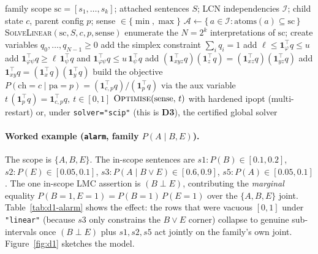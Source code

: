 \documentclass[11pt]{article}
\begin{document}
\begin{algorithm}[t]
\caption{D1 local credal set for one family (\texttt{\_build\_linear\_tight\_model})}
\label{alg:d1}
\begin{algorithmic}[1]
\Require family scope $\mathrm{sc}=[s_1,\dots,s_k]$; attached sentences $S$; LCN
  independencies $\mathcal I$; child state $c$, parent config $p$; sense $\in\{\min,\max\}$
\State $\mathcal A \gets \{\,a\in\mathcal I : \mathrm{atoms}(a)\subseteq \mathrm{sc}\,\}$
 \Return \textsc{SolveLinear}$(\mathrm{sc},S,c,p,\text{sense})$
\EndIf
\State enumerate the $N=2^{k}$ interpretations of $\mathrm{sc}$; create variables
  $q_0,\dots,q_{N-1}\ge 0$ 
\State add the simplex constraint $\sum_i q_i = 1$
     add $\ell \le \mathbf 1_\varphi^\top q \le u$
     add $\mathbf 1_{\varphi\psi}^\top q \ge \ell\,\mathbf 1_\psi^\top q$ and
     $\mathbf 1_{\varphi\psi}^\top q \le u\,\mathbf 1_\psi^\top q$
  \EndIf
\EndFor
{}
     add $(\mathbf 1_{xyz}^\top q)(\mathbf 1_z^\top q) = (\mathbf 1_{xz}^\top q)(\mathbf 1_{yz}^\top q)$
     add $\mathbf 1_{xy}^\top q = (\mathbf 1_x^\top q)(\mathbf 1_y^\top q)$
  \EndIf
\EndFor
\State build the objective $P(\mathrm{ch}{=}c\mid\mathrm{pa}{=}p)
  = (\mathbf 1_{c,p}^\top q)/(\mathbf 1_{p}^\top q)$ via the aux variable
  $t\,(\mathbf 1_p^\top q) = \mathbf 1_{c,p}^\top q,\ t\in[0,1]$
\State \Return $\textsc{Optimise}(\text{sense},\,t)$ with hardened ipopt
  (multi-restart) or, under \texttt{solver="scip"} (this is \textbf{D3}), the certified global
  solver
\end{algorithmic}
\end{algorithm}

\paragraph{Worked example (\texttt{alarm}, family $P(A\mid B,E)$).} The scope is $\{A,B,E\}$.
The in-scope sentences are $s1\!:\!P(B)\!\in\![0.1,0.2]$, $s2\!:\!P(E)\!\in\![0.05,0.1]$,
$s3\!:\!P(A\mid B{\lor}E)\!\in\![0.6,0.9]$, $s5\!:\!P(A)\!\in\![0.05,0.1]$. The one in-scope
LMC assertion is $(B\perp E)$, contributing the \emph{marginal} equality
$P(B{=}1,E{=}1)=P(B{=}1)\,P(E{=}1)$ over the $\{A,B,E\}$ joint. Table~\ref{tab:d1-alarm} shows
the effect: the rows that were vacuous $[0,1]$ under \texttt{"linear"} (because $s3$ only
constrains the $B{\lor}E$ corner) collapse to genuine sub-intervals once $(B\perp E)$ plus
$s1,s2,s5$ act jointly on the family's own joint. Figure~\ref{fig:d1} sketches the model.
\end{document}
